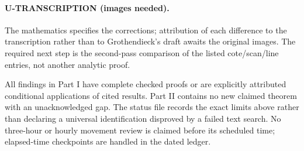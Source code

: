 \documentclass[11pt,a4paper]{article}
\begin{document}
\paragraph{U-TRANSCRIPTION (images needed).}
The mathematics specifies the corrections; attribution of each difference to the transcription rather than to Grothendieck's draft awaits the original images. The required next step is the second-pass comparison of the listed cote/scan/line entries, not another analytic proof.

All findings in Part I have complete checked proofs or are explicitly attributed conditional applications of cited results. Part II contains no new claimed theorem with an unacknowledged gap. The status file records the exact limits above rather than declaring a universal identification disproved by a failed text search. No three-hour or hourly movement review is claimed before its scheduled time; elapsed-time checkpoints are handled in the dated ledger.
\end{document}
